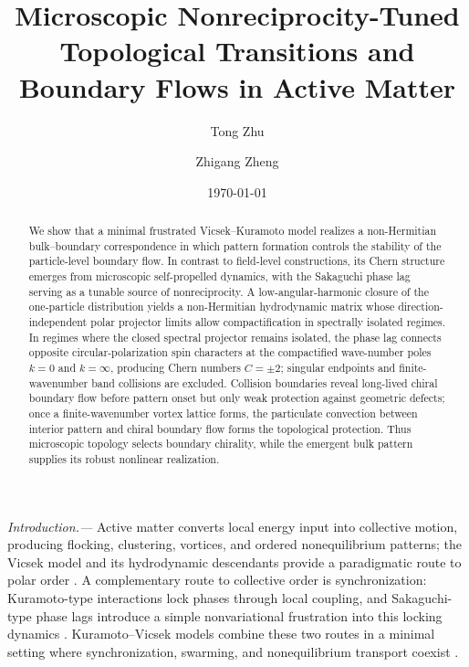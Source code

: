 \documentclass[aps,prl,reprint,superscriptaddress,nofootinbib,floatfix]{revtex4-2}
\begin{document}
\title{Microscopic Nonreciprocity-Tuned Topological Transitions and Boundary Flows in Active Matter}

\author{Tong Zhu}
\author{Zhigang Zheng}
\date{\today}

\begin{abstract}
We show that a minimal frustrated Vicsek--Kuramoto model realizes a non-Hermitian bulk--boundary correspondence in which pattern formation controls the stability of the particle-level boundary flow. In contrast to field-level constructions, its Chern structure emerges from microscopic self-propelled dynamics, with the Sakaguchi phase lag serving as a tunable source of nonreciprocity. A low-angular-harmonic closure of the one-particle distribution yields a non-Hermitian hydrodynamic matrix whose direction-independent polar projector limits allow compactification in spectrally isolated regimes. In regimes where the closed spectral projector remains isolated, the phase lag connects opposite circular-polarization spin characters at the compactified wave-number poles $k=0$ and $k=\infty$, producing Chern numbers $C=\pm2$; singular endpoints and finite-wavenumber band collisions are excluded. Collision boundaries reveal long-lived chiral boundary flow before pattern onset but only weak protection against geometric defects; once a finite-wavenumber vortex lattice forms, the particulate convection between interior pattern and chiral boundary flow forms the topological protection. Thus microscopic topology selects boundary chirality, while the emergent bulk pattern supplies its robust nonlinear realization.
\end{abstract}

\maketitle

\emph{Introduction.---}
Active matter converts local energy input into collective motion, producing flocking, clustering, vortices, and ordered nonequilibrium patterns; the Vicsek model and its hydrodynamic descendants provide a paradigmatic route to polar order \cite{Ramaswamy2010,Marchetti2013,Vicsek1995,TonerTu1995}. A complementary route to collective order is synchronization: Kuramoto-type interactions lock phases through local coupling, and Sakaguchi-type phase lags introduce a simple nonvariational frustration into this locking dynamics \cite{Kuramoto1984,Strogatz2000,Acebron2005,Sakaguchi1988}. Kuramoto--Vicsek models combine these two routes in a minimal setting where synchronization, swarming, and nonequilibrium transport coexist \cite{Degond2013KuramotoVicsek,Chate2015Memory,LiebchenLevis2017}.
\end{document}
